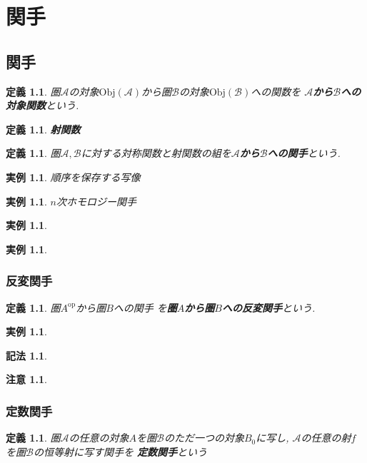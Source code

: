\documentclass[dvipdfmx]{jsbook}
\theoremstyle{plain}
\newtheorem{Def}[thm]{定義}
\newtheorem{Notation}[thm]{記法}
\newtheorem{caution}[thm]{注意}
\newtheorem{example}[thm]{実例}
\begin{document}
\chapter{関手}
\section{関手}
\begin{Def}
圏$\mathscr{A}$の対象$\mathrm{Obj}(\mathscr{A})$から圏$\mathscr{B}$の対象$\mathrm{Obj}(\mathscr{B})$への関数を
{\bf $\mathscr{A}$から$\mathscr{B}$への対象関数}という.
\end{Def}
\begin{Def}
{\bf 射関数}
\end{Def}
\begin{Def}
圏$\mathscr{A},\mathscr{B}$に対する対称関数と射関数の組を{\bf $\mathscr{A}$から$\mathscr{B}$への関手}という.
\end{Def}
\begin{example}
順序を保存する写像
\end{example}
\begin{example}
$n$次ホモロジー関手
\end{example}
\begin{example}
\end{example}
\begin{example}
\end{example}
\subsection{反変関手}
\begin{Def}
圏$A^{\mathrm{op}}$から圏$B$への関手
を{\bf 圏$A$から圏$B$への反変関手}という.
\end{Def}
\begin{example}
\end{example}
\begin{Notation}
\end{Notation}
\begin{caution}
\end{caution}
\subsection{定数関手}
\begin{Def}
圏$\mathscr{A}$の任意の対象$A$を圏$\mathscr{B}$のただ一つの対象$B_0$に写し,
$\mathscr{A}$の任意の射$f$を圏$\mathscr{B}$の恒等射に写す関手を
{\bf 定数関手}という
\end{Def}
\end{document}
